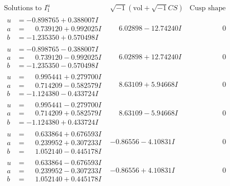 \documentclass[1p]{elsarticle_modified}
\theoremstyle{definition}
\newcommand{\I}{\sqrt{-1}}
\begin{document}
$$\begin{array}{c|c|c}  
\text{Solutions to }I^u_{1}& \I (\text{vol} + \sqrt{-1}CS) & \text{Cusp shape}\\
 \hline 
\begin{aligned}
u &= -0.898765 + 0.388007 I \\
a &= \phantom{-}0.739120 + 0.992025 I \\
b &= -1.235350 + 0.570498 I\end{aligned}
 & \phantom{-}6.02898 - 12.74240 I & \phantom{-0.000000 } 0 \\ \hline\begin{aligned}
u &= -0.898765 - 0.388007 I \\
a &= \phantom{-}0.739120 - 0.992025 I \\
b &= -1.235350 - 0.570498 I\end{aligned}
 & \phantom{-}6.02898 + 12.74240 I & \phantom{-0.000000 } 0 \\ \hline\begin{aligned}
u &= \phantom{-}0.995441 + 0.279700 I \\
a &= \phantom{-}0.714209 - 0.582579 I \\
b &= -1.124380 - 0.433724 I\end{aligned}
 & \phantom{-}8.63109 + 5.94668 I & \phantom{-0.000000 } 0 \\ \hline\begin{aligned}
u &= \phantom{-}0.995441 - 0.279700 I \\
a &= \phantom{-}0.714209 + 0.582579 I \\
b &= -1.124380 + 0.433724 I\end{aligned}
 & \phantom{-}8.63109 - 5.94668 I & \phantom{-0.000000 } 0 \\ \hline\begin{aligned}
u &= \phantom{-}0.633864 + 0.676593 I \\
a &= \phantom{-}0.239952 + 0.307233 I \\
b &= \phantom{-}1.052140 - 0.445178 I\end{aligned}
 & -0.86556 - 4.10831 I & \phantom{-0.000000 } 0 \\ \hline\begin{aligned}
u &= \phantom{-}0.633864 - 0.676593 I \\
a &= \phantom{-}0.239952 - 0.307233 I \\
b &= \phantom{-}1.052140 + 0.445178 I\end{aligned}
 & -0.86556 + 4.10831 I & \phantom{-0.000000 } 0 \\ \hline\begin{aligned}

\end{aligned}
\end{array}$$
\end{document}
